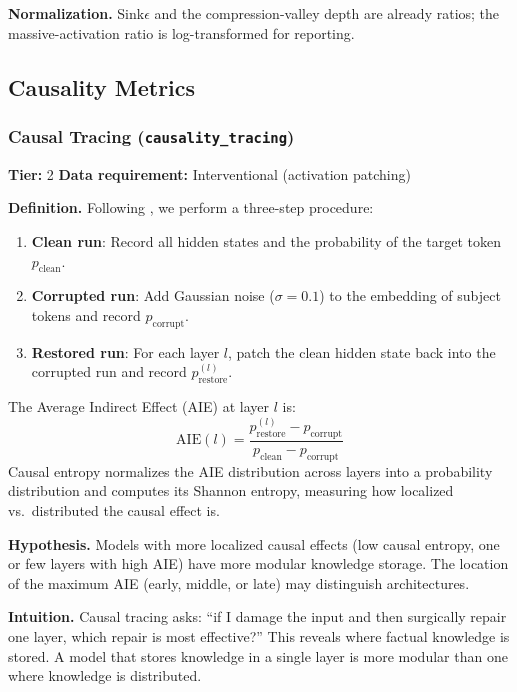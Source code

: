 \documentclass[preprint]{neurips_2025}
\begin{document}
\textbf{Normalization.} Sink$\epsilon$ and the compression-valley depth are already ratios; the massive-activation ratio is log-transformed for reporting.

\subsection{Causality Metrics}
\label{app:causality}

\subsubsection{Causal Tracing (\texttt{causality\_tracing})}
\label{app:tracing}

\textbf{Tier:} 2 \quad \textbf{Data requirement:} Interventional (activation patching)

\textbf{Definition.}
Following \citet{meng2022locating}, we perform a three-step procedure:
\begin{enumerate}
  \item \textbf{Clean run}: Record all hidden states and the probability of the target token $p_{\text{clean}}$.
  \item \textbf{Corrupted run}: Add Gaussian noise ($\sigma = 0.1$) to the embedding of subject tokens and record $p_{\text{corrupt}}$.
  \item \textbf{Restored run}: For each layer $l$, patch the clean hidden state back into the corrupted run and record $p_{\text{restore}}^{(l)}$.
\end{enumerate}
The Average Indirect Effect (AIE) at layer $l$ is:
\begin{equation}
  \text{AIE}(l) = \frac{p_{\text{restore}}^{(l)} - p_{\text{corrupt}}}{p_{\text{clean}} - p_{\text{corrupt}}}
\end{equation}
Causal entropy normalizes the AIE distribution across layers into a probability distribution and computes its Shannon entropy, measuring how localized vs.\ distributed the causal effect is.

\textbf{Hypothesis.}
Models with more localized causal effects (low causal entropy, one or few layers with high AIE) have more modular knowledge storage. The location of the maximum AIE (early, middle, or late) may distinguish architectures.

\textbf{Intuition.}
Causal tracing asks: ``if I damage the input and then surgically repair one layer, which repair is most effective?'' This reveals where factual knowledge is stored. A model that stores knowledge in a single layer is more modular than one where knowledge is distributed.
\end{document}
